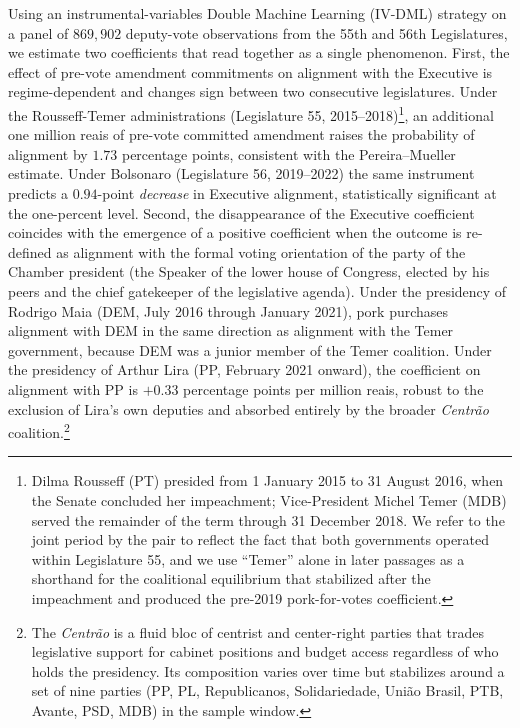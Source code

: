 \documentclass[pdflatex,sn-basic]{sn-jnl}
\begin{document}
Using an instrumental-variables Double Machine Learning (IV-DML) strategy on a panel of $869{,}902$ deputy-vote observations from the 55th and 56th Legislatures, we estimate two coefficients that read together as a single phenomenon. First, the effect of pre-vote amendment commitments on alignment with the Executive is regime-dependent and changes sign between two consecutive legislatures. Under the Rousseff-Temer administrations (Legislature 55, 2015--2018)\footnote{Dilma Rousseff (PT) presided from 1 January 2015 to 31 August 2016, when the Senate concluded her impeachment; Vice-President Michel Temer (MDB) served the remainder of the term through 31 December 2018. We refer to the joint period by the pair to reflect the fact that both governments operated within Legislature 55, and we use ``Temer'' alone in later passages as a shorthand for the coalitional equilibrium that stabilized after the impeachment and produced the pre-2019 pork-for-votes coefficient.}, an additional one million reais of pre-vote committed amendment raises the probability of alignment by $1.73$ percentage points, consistent with the Pereira--Mueller estimate. Under Bolsonaro (Legislature 56, 2019--2022) the same instrument predicts a $0.94$-point \emph{decrease} in Executive alignment, statistically significant at the one-percent level. Second, the disappearance of the Executive coefficient coincides with the emergence of a positive coefficient when the outcome is re-defined as alignment with the formal voting orientation of the party of the Chamber president (the Speaker of the lower house of Congress, elected by his peers and the chief gatekeeper of the legislative agenda). Under the presidency of Rodrigo Maia (DEM, July 2016 through January 2021), pork purchases alignment with DEM in the same direction as alignment with the Temer government, because DEM was a junior member of the Temer coalition. Under the presidency of Arthur Lira (PP, February 2021 onward), the coefficient on alignment with PP is $+0.33$ percentage points per million reais, robust to the exclusion of Lira's own deputies and absorbed entirely by the broader \emph{Centr\~ao} coalition.\footnote{The \emph{Centr\~ao} is a fluid bloc of centrist and center-right parties that trades legislative support for cabinet positions and budget access regardless of who holds the presidency. Its composition varies over time but stabilizes around a set of nine parties (PP, PL, Republicanos, Solidariedade, Uni\~ao Brasil, PTB, Avante, PSD, MDB) in the sample window.}
\end{document}

